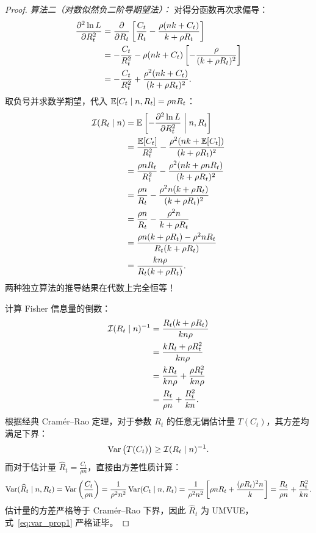 \begin{proof}
\textit{算法二（对数似然负二阶导期望法）：}
对得分函数再次求偏导：
\begin{align}
\frac{\partial^2 \ln L}{\partial R_t^2} &= \frac{\partial}{\partial R_t} \left[ \frac{C_t}{R_t} - \frac{\rho(nk + C_t)}{k + \rho R_t} \right] \notag \\
&= -\frac{C_t}{R_t^2} - \rho(nk + C_t) \left[ -\frac{\rho}{(k + \rho R_t)^2} \right] \notag \\
&= -\frac{C_t}{R_t^2} + \frac{\rho^2 (nk + C_t)}{(k + \rho R_t)^2}.
\end{align}
取负号并求数学期望，代入 $\operatorname{\mathbb{E}}[C_t \mid n, R_t] = \rho n R_t$：
\begin{align}
\mathcal{I}(R_t \mid n) &= \operatorname{\mathbb{E}}\left[ -\frac{\partial^2 \ln L}{\partial R_t^2} \;\middle|\; n, R_t \right] \notag \\
&= \frac{\operatorname{\mathbb{E}}[C_t]}{R_t^2} - \frac{\rho^2(nk + \operatorname{\mathbb{E}}[C_t])}{(k + \rho R_t)^2} \notag \\
&= \frac{\rho n R_t}{R_t^2} - \frac{\rho^2(nk + \rho n R_t)}{(k + \rho R_t)^2} \notag \\
&= \frac{\rho n}{R_t} - \frac{\rho^2 n(k + \rho R_t)}{(k + \rho R_t)^2} \notag \\
&= \frac{\rho n}{R_t} - \frac{\rho^2 n}{k + \rho R_t} \notag \\
&= \frac{\rho n (k + \rho R_t) - \rho^2 n R_t}{R_t(k + \rho R_t)} \notag \\
&= \frac{k n \rho}{R_t (k + \rho R_t)}. \label{eq:fisher_alg2}
\end{align}
两种独立算法的推导结果在代数上完全恒等！

计算 Fisher 信息量的倒数：
\begin{align}
\mathcal{I}(R_t \mid n)^{-1} &= \frac{R_t(k + \rho R_t)}{k n \rho} \notag \\
&= \frac{k R_t + \rho R_t^2}{k n \rho} \notag \\
&= \frac{k R_t}{k n \rho} + \frac{\rho R_t^2}{k n \rho} \notag \\
&= \frac{R_t}{\rho n} + \frac{R_t^2}{k n}. \label{eq:fisher_inv}
\end{align}
根据经典 Cramér--Rao 定理，对于参数 $R_t$ 的任意无偏估计量 $T(C_t)$，其方差均满足下界：
\begin{equation}
\operatorname{Var}\big( T(C_t) \big) \ge \mathcal{I}(R_t \mid n)^{-1}.
\end{equation}
而对于估计量 $\widehat{R}_t = \frac{C_t}{\rho n}$，直接由方差性质计算：
\begin{equation}
\operatorname{Var}(\widehat{R}_t \mid n, R_t) = \operatorname{Var}\left( \frac{C_t}{\rho n} \right) = \frac{1}{\rho^2 n^2} \operatorname{Var}(C_t \mid n, R_t) = \frac{1}{\rho^2 n^2} \left[ \rho n R_t + \frac{(\rho R_t)^2 n}{k} \right] = \frac{R_t}{\rho n} + \frac{R_t^2}{k n}.
\end{equation}
估计量的方差严格等于 Cramér--Rao 下界，因此 $\widehat{R}_t$ 为 UMVUE，式~\eqref{eq:var_prop1} 严格证毕。
\end{proof}

